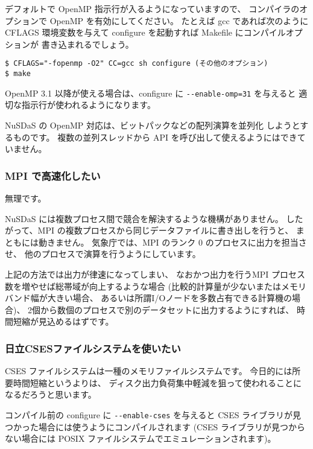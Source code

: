 デフォルトで OpenMP 指示行が入るようになっていますので、
コンパイラのオプションで OpenMP を有効にしてください。
たとえば gcc であれば次のように CFLAGS 環境変数を与えて
configure を起動すれば Makefile にコンパイルオプションが
書き込まれるでしょう。

\begin{screen}
\begin{verbatim}
$ CFLAGS="-fopenmp -O2" CC=gcc sh configure (その他のオプション)
$ make
\end{verbatim}
\end{screen}

OpenMP 3.1 以降が使える場合は、configure に \verb|--enable-omp=31| を与えると
適切な指示行が使われるようになります。

NuSDaS の OpenMP 対応は、ビットパックなどの配列演算を並列化
しようとするものです。
複数の並列スレッドから API を呼び出して使えるようにはできていません。

\subsubsection{MPI で高速化したい}

無理です。

NuSDaS には複数プロセス間で競合を解決するような機構がありません。
したがって、MPI の複数プロセスから同じデータファイルに書き出しを行うと、
まともには動きません。
気象庁では、MPI のランク 0 のプロセスに出力を担当させ、
他のプロセスで演算を行うようにしています。

上記の方法では出力が律速になってしまい、
なおかつ出力を行うMPI プロセス数を増やせば総帯域が向上するような場合
(比較的計算量が少ないまたはメモリバンド幅が大きい場合、
あるいは所謂I/Oノードを多数占有できる計算機の場合)、
2個から数個のプロセスで別のデータセットに出力するようにすれば、
時間短縮が見込めるはずです。

\subsubsection{日立CSESファイルシステムを使いたい}

CSES ファイルシステムは一種のメモリファイルシステムです。
今日的には所要時間短縮というよりは、
ディスク出力負荷集中軽減を狙って使われることになるだろうと思います。

コンパイル前の configure に \verb|--enable-cses| を与えると
CSES ライブラリが見つかった場合には使うようにコンパイルされます
(CSES ライブラリが見つからない場合には
POSIX ファイルシステムでエミュレーションされます)。

